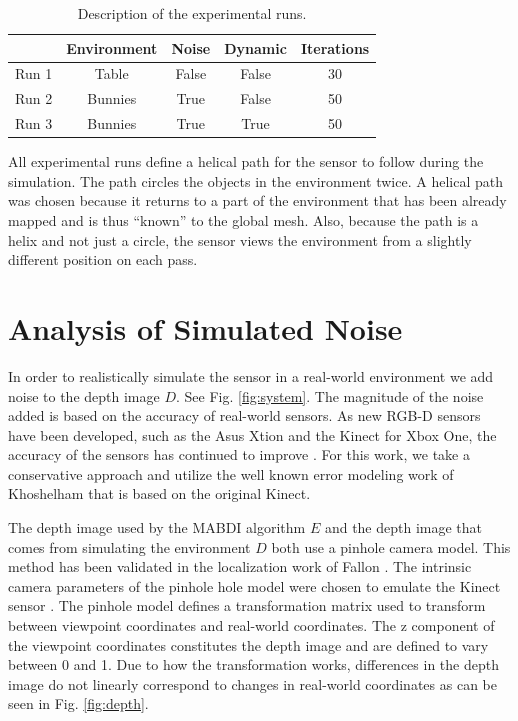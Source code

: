 \begin{table}[h]
  \caption{Description of the experimental runs.}
  \label{tab:run}
  \begin{footnotesize}
  \begin{center}
    \begin{tabular}{|l|c|c|c|c|}
    \hline
           & Environment & Noise   & Dynamic & Iterations \\\hline
    Run 1	 & Table       & False   & False   & 30 \\
    Run 2  & Bunnies     & True    & False   & 50 \\
    Run 3  & Bunnies     & True    & True    & 50 \\
    \hline
    \end{tabular}
  \end{center}
  \end{footnotesize}
\end{table}

All experimental runs define a helical path for the sensor to follow during the
simulation. The path circles the objects in the environment twice. A helical
path was chosen because it returns to a part of the environment that has been
already mapped and is thus ``known'' to the global mesh. Also, because the path
is a helix and not just a circle, the sensor views the environment from a
slightly different position on each pass.

\section{Analysis of Simulated Noise}

In order to realistically simulate the sensor in a real-world environment we add
noise to the depth image $D$. See Fig. \ref{fig:system}. The magnitude of the
noise added is based on the accuracy of real-world sensors. As new RGB-D sensors
have been developed, such as the Asus Xtion and the Kinect for Xbox One, the
accuracy of the sensors has continued to improve \cite{lachat2015first}. For
this work, we take a conservative approach and utilize the well known error
modeling work of Khoshelham \cite{Khoshelham2012} that is based on the original
Kinect.

The depth image used by the MABDI algorithm $E$ and the depth image that comes
from simulating the environment $D$ both use a pinhole camera model. This method
has been validated in the localization work of Fallon \cite{Fallon2012}. The
intrinsic camera parameters of the pinhole hole model were chosen to emulate the
Kinect sensor \cite{sitekinectspecs}. The pinhole model defines a transformation
matrix used to transform between viewpoint coordinates and real-world
coordinates. The z component of the viewpoint coordinates constitutes the depth
image and are defined to vary between 0 and 1. Due to how the transformation
works, differences in the depth image do not linearly correspond to changes in
real-world coordinates as can be seen in Fig. \ref{fig:depth}.

